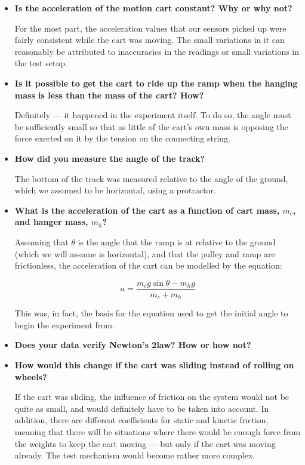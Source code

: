 \begin{itemize}

\item \textbf{Is the acceleration of the motion cart constant? Why or why not?}

For the most part, the acceleration values that our sensors picked up were fairly consistent while the cart was moving.
The small variations in it can reasonably be attributed to inaccuracies in the readings or small variations in the test setup.

\item \textbf{Is it possible to get the cart to ride up the ramp when the hanging mass is less than the mass of the cart? How?}

Definitely --- it happened in the experiment itself.
To do so, the angle must be sufficiently small so that as little of the cart's own mass is opposing the force exerted on it by the tension on the connecting string.

\item \textbf{How did you measure the angle of the track?}

The bottom of the track was measured relative to the angle of the ground, which we assumed to be horizontal, using a protractor.

\item \textbf{What is the acceleration of the cart as a function of cart mass, \begin{math}m_c\end{math}, and hanger mass, \begin{math}m_h\end{math}?}

Assuming that \ensuremath{\theta} is the angle that the ramp is at relative to the ground (which we will assume is horizontal), and that the pulley
and ramp are frictionless, the acceleration of the cart can be modelled by the equation:

\begin{displaymath}a = \frac{m_c g \sin \theta - m_h g}{m_c + m_h}\end{displaymath}

This was, in fact, the basis for the equation used to get the initial angle to begin the experiment from.

\item \textbf{Does your data verify Newton's 2\nd law? How or how not?}

\item \textbf{How would this change if the cart was sliding instead of rolling on wheels?}

If the cart was sliding, the influence of friction on the system would not be quite as small, and would definitely have to be taken into account.
In addition, there are different coefficients for static and kinetic friction, meaning that there will be situations where there would be enough force from the weights to keep the cart moving --- but only if the cart was moving already.
The test mechanism would become rather more complex.

\end{itemize}

